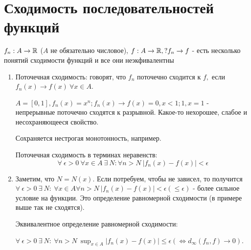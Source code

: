\documentclass[12pt]{report}
\begin{document}
\chapter{Сходимость последовательностей функций}

\begin{rem}
$f_n: A \to \mathbb{R}$ ($A$ не обязательно числовое), $f: A \to \mathbb{R}, ? f_n \to f$  - есть несколько понятий сходимости функций и все они неэкфивалентны
\end{rem}

\begin{defn}
\begin{enumerate}
\item Поточечная сходимость: говорят, что $f_n$ поточечно сходится к $f,$ если $f_n(x) \to f(x) ~\forall x \in A$.

\begin{ex}
$A = [0, 1], f_n(x) = x^n; f_n(x) \to f(x) = 0, x < 1; 1, x = 1$ - непрерывные поточечно сходятся к разрывной. Какое-то нехорошее, слабое и несохраняющееся свойство.

Сохраняется нестрогая монотонность, например.
\end{ex}

Поточечная сходимость в терминах неравенств:
$$\forall ~\epsilon > 0 ~\forall x \in A ~\exists ~N: \forall n > N ~|f_n(x) - f(x)| < \epsilon$$
\item
Заметим, что $N = N(x)$. Если потребуем, чтобы не зависел, то получится $\forall ~\epsilon > 0 ~\exists ~N: ~\forall x \in A \forall n > N ~|f_n(x) - f(x)| < \epsilon (\le \epsilon)$ - более сильное условие на функции. Это определение равномерной сходимости (в примере выше так не сходятся).

Эквивалентное определение равномерной сходимости:

$\forall ~\epsilon > 0 ~\exists ~N: ~\forall n > N ~\sup_{x \in A}{|f_n(x) - f(x)|} \le \epsilon (\Leftrightarrow d_{\infty}(f_n, f) \to 0)$.
\end{enumerate}
\end{defn}
\end{document}

